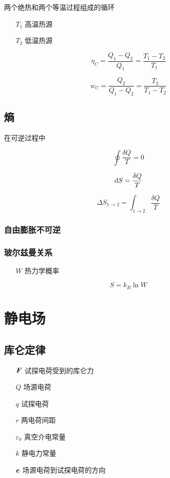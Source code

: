 \documentclass{article}
\begin{document}
两个绝热和两个等温过程组成的循环

\begin{enumerate}
    \item[$T_1$] 高温热源
    \item[$T_2$] 低温热源
\end{enumerate}

\[\eta_C=\frac{Q_1-Q_2}{Q_1}=\frac{T_1-T_2}{T_1}\]

\[w_C=\frac{Q_2}{Q_1-Q_2}=\frac{T_2}{T_1-T_2}\]

\subsection{熵}

在可逆过程中

\[\oint\frac{\delta Q}T=0\]

\[\mathrm d S=\frac{\delta Q}T\]

\[\Delta S_{1\to2}=\int_{1\to2}\frac{\delta Q}T\]

\subsubsection{自由膨胀不可逆}

\subsubsection{玻尔兹曼关系}

\begin{enumerate}
    \item[$W$] 热力学概率
\end{enumerate}

\[S=k_B\ln W\]

\section{静电场}

\subsection{库仑定律}

\begin{enumerate}
    \item[$\boldsymbol{F}$] 试探电荷受到的库仑力
    \item[$Q$] 场源电荷
    \item[$q$] 试探电荷
    \item[$r$] 两电荷间距
    \item[$\varepsilon_0$] 真空介电常量
    \item[$k$] 静电力常量
    \item[$\boldsymbol{e}$] 场源电荷到试探电荷的方向
\end{enumerate}
\end{document}
